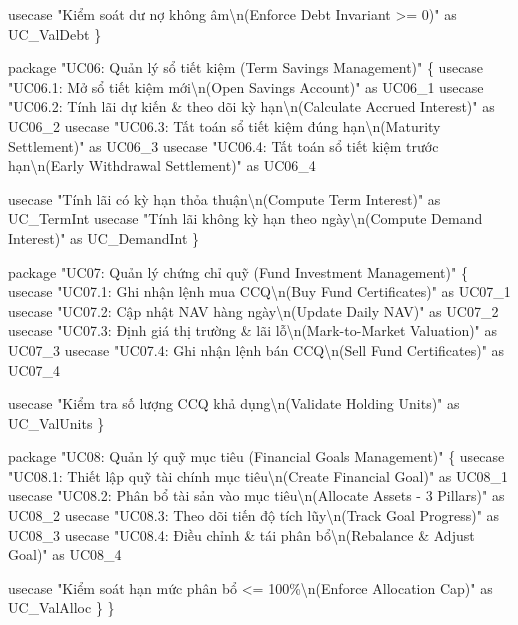 \documentclass[11pt,a4paper]{article}
\newenvironment{Shaded}{}{}
\newcommand{\NormalTok}[1]{#1}
\begin{document}
\begin{Shaded}
\begin{Highlighting}[]
\NormalTok{        usecase "Kiểm soát dư nợ không âm\textbackslash{}n(Enforce Debt Invariant \textgreater{}= 0)" as UC\_ValDebt}
\NormalTok{    \}}

\NormalTok{    package "UC06: Quản lý sổ tiết kiệm (Term Savings Management)" \{}
\NormalTok{        usecase "UC06.1: Mở sổ tiết kiệm mới\textbackslash{}n(Open Savings Account)" as UC06\_1}
\NormalTok{        usecase "UC06.2: Tính lãi dự kiến \& theo dõi kỳ hạn\textbackslash{}n(Calculate Accrued Interest)" as UC06\_2}
\NormalTok{        usecase "UC06.3: Tất toán sổ tiết kiệm đúng hạn\textbackslash{}n(Maturity Settlement)" as UC06\_3}
\NormalTok{        usecase "UC06.4: Tất toán sổ tiết kiệm trước hạn\textbackslash{}n(Early Withdrawal Settlement)" as UC06\_4}
        
\NormalTok{        usecase "Tính lãi có kỳ hạn thỏa thuận\textbackslash{}n(Compute Term Interest)" as UC\_TermInt}
\NormalTok{        usecase "Tính lãi không kỳ hạn theo ngày\textbackslash{}n(Compute Demand Interest)" as UC\_DemandInt}
\NormalTok{    \}}

\NormalTok{    package "UC07: Quản lý chứng chỉ quỹ (Fund Investment Management)" \{}
\NormalTok{        usecase "UC07.1: Ghi nhận lệnh mua CCQ\textbackslash{}n(Buy Fund Certificates)" as UC07\_1}
\NormalTok{        usecase "UC07.2: Cập nhật NAV hàng ngày\textbackslash{}n(Update Daily NAV)" as UC07\_2}
\NormalTok{        usecase "UC07.3: Định giá thị trường \& lãi lỗ\textbackslash{}n(Mark{-}to{-}Market Valuation)" as UC07\_3}
\NormalTok{        usecase "UC07.4: Ghi nhận lệnh bán CCQ\textbackslash{}n(Sell Fund Certificates)" as UC07\_4}
        
\NormalTok{        usecase "Kiểm tra số lượng CCQ khả dụng\textbackslash{}n(Validate Holding Units)" as UC\_ValUnits}
\NormalTok{    \}}

\NormalTok{    package "UC08: Quản lý quỹ mục tiêu (Financial Goals Management)" \{}
\NormalTok{        usecase "UC08.1: Thiết lập quỹ tài chính mục tiêu\textbackslash{}n(Create Financial Goal)" as UC08\_1}
\NormalTok{        usecase "UC08.2: Phân bổ tài sản vào mục tiêu\textbackslash{}n(Allocate Assets {-} 3 Pillars)" as UC08\_2}
\NormalTok{        usecase "UC08.3: Theo dõi tiến độ tích lũy\textbackslash{}n(Track Goal Progress)" as UC08\_3}
\NormalTok{        usecase "UC08.4: Điều chỉnh \& tái phân bổ\textbackslash{}n(Rebalance \& Adjust Goal)" as UC08\_4}
        
\NormalTok{        usecase "Kiểm soát hạn mức phân bổ \textless{}= 100\%\textbackslash{}n(Enforce Allocation Cap)" as UC\_ValAlloc}
\NormalTok{    \}}
\NormalTok{\}}


\end{Highlighting}
\end{Shaded}
\end{document}

